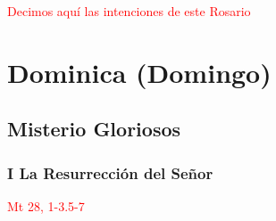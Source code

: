 \documentclass[10pt,twoside]{book}
\begin{document}
\begin{paracol}{2}
      \begin{leftcolumn*}
            
      \end{leftcolumn*}
      \begin{otherlanguage}{latin}
            \begin{rightcolumn}
                
            \end{rightcolumn}
      \end{otherlanguage}

      \begin{leftcolumn*}
            
      \end{leftcolumn*}
      \begin{otherlanguage}{latin}
            \begin{rightcolumn}
                
            \end{rightcolumn}
      \end{otherlanguage}
\end{paracol}

\vspace{0.5em}

\begin{center}
      \textcolor{red}{Decimos aquí las intenciones de este Rosario}
\end{center}

\section*{\centering Dominica (Domingo)}

\noindent\subsection*{Misterio Gloriosos}

\noindent\subsubsection*{I La Resurrección del Señor}

\vspace{-0.5em}

\hfill\textcolor{red}{Mt 28, 1-3.5-7}
\end{document}
